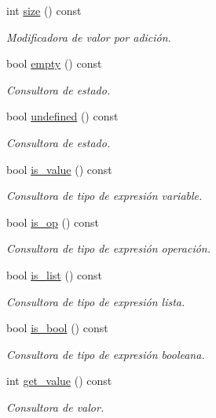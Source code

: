 \begin{DoxyCompactItemize}
int \hyperlink{class_expression_a0e8980139631cf7bc9fd3bca9d8caddc}{size} () const 
\begin{DoxyCompactList}\small\item\em Modificadora de valor por adición. \end{DoxyCompactList}\item 
bool \hyperlink{class_expression_a0020daf119d82799da034fd0513ca614}{empty} () const 
\begin{DoxyCompactList}\small\item\em Consultora de estado. \end{DoxyCompactList}\item 
bool \hyperlink{class_expression_a97f9b6fc78a7ef17dd9595e53a9b6239}{undefined} () const 
\begin{DoxyCompactList}\small\item\em Consultora de estado. \end{DoxyCompactList}\item 
bool \hyperlink{class_expression_a4ee60df2f212d8a4cc228ce7db2da81b}{is\+\_\+value} () const 
\begin{DoxyCompactList}\small\item\em Consultora de tipo de expresión variable. \end{DoxyCompactList}\item 
bool \hyperlink{class_expression_a422fb496720b177eaed37a9694613384}{is\+\_\+op} () const 
\begin{DoxyCompactList}\small\item\em Consultora de tipo de expresión operación. \end{DoxyCompactList}\item 
bool \hyperlink{class_expression_ae835c069faf7d6821fe6037e384f02c0}{is\+\_\+list} () const 
\begin{DoxyCompactList}\small\item\em Consultora de tipo de expresión lista. \end{DoxyCompactList}\item 
bool \hyperlink{class_expression_ad42c70dcee3b195c77749ca6435c244d}{is\+\_\+bool} () const 
\begin{DoxyCompactList}\small\item\em Consultora de tipo de expresión booleana. \end{DoxyCompactList}\item 
int \hyperlink{class_expression_add3f908cb67ed993a5e886447fd70df0}{get\+\_\+value} () const 
\begin{DoxyCompactList}\small\item\em Consultora de valor. \end{DoxyCompactList}\item 

\end{DoxyCompactItemize}
